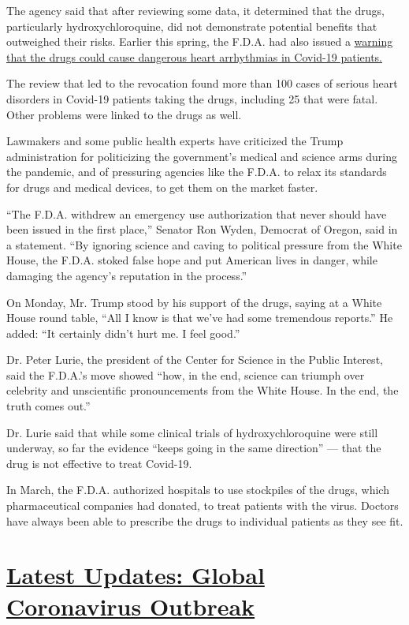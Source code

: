 The agency said that after reviewing some data, it determined that the
drugs, particularly hydroxychloroquine, did not demonstrate potential
benefits that outweighed their risks. Earlier this spring, the F.D.A.
had also issued a
\href{https://www.nytimes3xbfgragh.onion/2020/04/24/health/fda-hydroxychloroquine-coronavirus.html}{warning
that the drugs could cause dangerous heart arrhythmias in Covid-19
patients.}

The review that led to the revocation found more than 100 cases of
serious heart disorders in Covid-19 patients taking the drugs, including
25 that were fatal. Other problems were linked to the drugs as well.

Lawmakers and some public health experts have criticized the Trump
administration for politicizing the government's medical and science
arms during the pandemic, and of pressuring agencies like the F.D.A. to
relax its standards for drugs and medical devices, to get them on the
market faster.

``The F.D.A. withdrew an emergency use authorization that never should
have been issued in the first place,'' Senator Ron Wyden, Democrat of
Oregon, said in a statement. ``By ignoring science and caving to
political pressure from the White House, the F.D.A. stoked false hope
and put American lives in danger, while damaging the agency's reputation
in the process.''

On Monday, Mr. Trump stood by his support of the drugs, saying at a
White House round table, ``All I know is that we've had some tremendous
reports.'' He added: ``It certainly didn't hurt me. I feel good.''

Dr. Peter Lurie, the president of the Center for Science in the Public
Interest, said the F.D.A.'s move showed ``how, in the end, science can
triumph over celebrity and unscientific pronouncements from the White
House. In the end, the truth comes out.''

Dr. Lurie said that while some clinical trials of hydroxychloroquine
were still underway, so far the evidence ``keeps going in the same
direction'' --- that the drug is not effective to treat Covid-19.

In March, the F.D.A. authorized hospitals to use stockpiles of the
drugs, which pharmaceutical companies had donated, to treat patients
with the virus. Doctors have always been able to prescribe the drugs to
individual patients as they see fit.

\hypertarget{latest-updates-global-coronavirus-outbreak}{%
\section{\texorpdfstring{\href{https://www.nytimes3xbfgragh.onion/2020/08/01/world/coronavirus-covid-19.html?action=click\&pgtype=Article\&state=default\&region=MAIN_CONTENT_1\&context=storylines_live_updates}{Latest
Updates: Global Coronavirus
Outbreak}}{Latest Updates: Global Coronavirus Outbreak}}\label{latest-updates-global-coronavirus-outbreak}}

